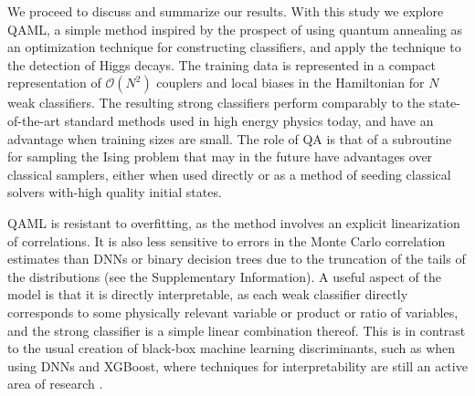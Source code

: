 \documentclass[fleqn,10pt]{wlscirep}
\begin{document}
We proceed to discuss and summarize our results.
With this study we explore QAML, a simple method inspired by the prospect of using quantum annealing as an optimization technique for constructing classifiers, and apply the technique to the detection of Higgs decays. The training data is represented in a compact representation of $\mathcal{O}(N^2)$ couplers and local biases in the Hamiltonian for $N$ weak classifiers.
The resulting strong classifiers perform comparably to the state-of-the-art standard methods used in high energy physics today, and have an advantage when training sizes are small.  The role of QA is that of a subroutine for sampling the Ising problem that may in the future have advantages over classical samplers, either when used directly or as a method of seeding classical solvers with-high quality initial states.

QAML is resistant to overfitting, as the method involves an explicit linearization of correlations. It is also less sensitive to errors in the Monte Carlo correlation estimates than DNNs or binary decision trees due to the truncation of the tails of the distributions (see the Supplementary Information). 
A useful aspect of the model is that it is directly interpretable, as each weak classifier directly corresponds to some physically relevant variable or product or ratio of variables, and the strong classifier is a simple linear combination thereof. This is in contrast to the usual creation of black-box machine learning discriminants, such as when using DNNs and XGBoost, where techniques for interpretability are still an active area of research \cite{Chen:2016aa}. 
\end{document}
